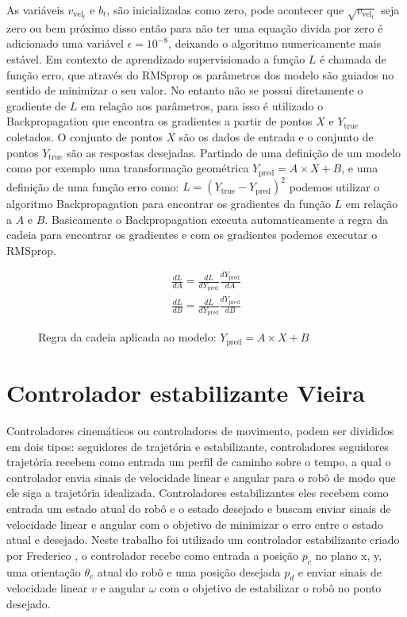 As variáveis $v_{\text{vel}_t}$ e  $b_t$, são inicializadas como zero, pode acontecer
que  $\sqrt{v_{\text{vel}_t}}$ seja zero ou bem próximo disso então para não ter uma equação
divida por zero é adicionado uma variável $\epsilon =10^{-8}$, deixando o algoritmo numericamente
mais estável. Em contexto de aprendizado supervisionado a função $L$ é chamada de função erro, que 
através do RMSprop os parâmetros dos modelo são guiados no sentido de minimizar o seu valor.
No entanto não se possui diretamente o gradiente de $L$ em relação aos parâmetros, para isso
é utilizado o  Backpropagation que encontra os gradientes a partir
de pontos $X$ e $Y_{\text{true}}$ coletados. O conjunto de pontos $X$ são
os dados de entrada
e o conjunto de pontos  $Y_{\text{true}}$ são as respostas desejadas.
Partindo de  uma definição de um modelo como por exemplo uma
transformação geométrica $Y_{\text{pred}}= A \times X + B$, e uma definição de uma função
erro como: $L=(Y_{\text{true}}- Y_{\text{pred}})^2$ podemos utilizar o algoritmo
Backpropagation para encontrar os gradientes da função $L$ em relação a $A$
e  $B$. Basicamente o Backpropagation executa automaticamente a regra da cadeia
para encontrar os gradientes e com os gradientes podemos executar o RMSprop.

\begin{figure}[H]
    \begin{align*}
        \frac{dL}{dA } = \frac{dL}{dY_{\text{pred}} } \frac{dY_{\text{pred}}}{dA}  \\
        \frac{dL}{dB } = \frac{dL}{dY_{\text{pred}} } \frac{dY_{\text{pred}}}{dB} 
    \end{align*}
    \caption{Regra da cadeia aplicada ao modelo: $Y_{\text{pred}}= A \times X + B$ }
\end{figure}

\section{Controlador estabilizante Vieira}
Controladores cinemáticos ou controladores de movimento, podem ser 
divididos em dois tipos: seguidores de trajetória e estabilizante,
controladores seguidores trajetória recebem como entrada um perfil
de caminho sobre o tempo, a qual o controlador envia sinais de
velocidade linear e angular para o robô de modo que ele siga a
trajetória idealizada. Controladores estabilizantes
eles recebem como entrada um estado atual do robô e o estado desejado
e buscam enviar sinais de velocidade linear e angular com o objetivo
de minimizar o erro entre o estado atual e desejado. Neste trabalho
foi utilizado um controlador estabilizante criado por Frederico
\cite{vieira2006controle}, o controlador recebe como entrada a posição
$p_c$  no plano x, y, uma orientação $\theta_c$ atual do robô e uma
posição desejada $p_d$ e enviar sinais de velocidade linear $v$ e
angular $\omega$ com o objetivo de estabilizar o robô no ponto desejado.


